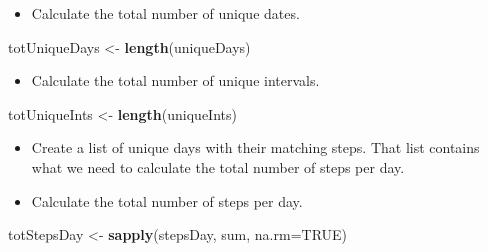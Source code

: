 \documentclass[]{article}
\newenvironment{Shaded}{\begin{snugshade}}{\end{snugshade}}
\newcommand{\KeywordTok}[1]{\textcolor[rgb]{0.13,0.29,0.53}{\textbf{#1}}}
\newcommand{\DataTypeTok}[1]{\textcolor[rgb]{0.13,0.29,0.53}{#1}}
\newcommand{\StringTok}[1]{\textcolor[rgb]{0.31,0.60,0.02}{#1}}
\newcommand{\OtherTok}[1]{\textcolor[rgb]{0.56,0.35,0.01}{#1}}
\newcommand{\OperatorTok}[1]{\textcolor[rgb]{0.81,0.36,0.00}{\textbf{#1}}}
\newcommand{\NormalTok}[1]{#1}
\providecommand{\tightlist}{%
  \setlength{\itemsep}{0pt}\setlength{\parskip}{0pt}}
\begin{document}
\begin{itemize}
\tightlist
\item
  Calculate the total number of unique dates.
\end{itemize}

\begin{Shaded}
\begin{Highlighting}[]
\NormalTok{totUniqueDays <-}\StringTok{ }\KeywordTok{length}\NormalTok{(uniqueDays)}
\end{Highlighting}
\end{Shaded}

\begin{itemize}
\tightlist
\item
  Calculate the total number of unique intervals.
\end{itemize}

\begin{Shaded}
\begin{Highlighting}[]
\NormalTok{totUniqueInts <-}\StringTok{ }\KeywordTok{length}\NormalTok{(uniqueInts)}
\end{Highlighting}
\end{Shaded}

\begin{itemize}
\tightlist
\item
  Create a list of unique days with their matching steps. That list
  contains what we need to calculate the total number of steps per day.
\end{itemize}

\begin{Shaded}
\end{Shaded}

\begin{itemize}
\tightlist
\item
  Calculate the total number of steps per day.
\end{itemize}

\begin{Shaded}
\begin{Highlighting}[]
\NormalTok{totStepsDay <-}\StringTok{ }\KeywordTok{sapply}\NormalTok{(stepsDay, sum, }\DataTypeTok{na.rm=}\OtherTok{TRUE}\NormalTok{) }
\end{Highlighting}
\end{Shaded}
\end{document}
